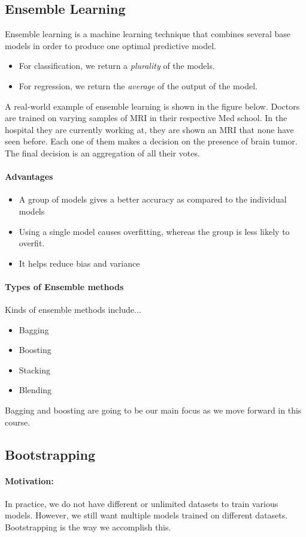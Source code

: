 \documentclass[10pt,a4paper]{report}
\begin{document}
\subsection{Ensemble Learning}
Ensemble learning is a machine learning technique that combines several base models in order to produce one optimal predictive model.
\begin{itemize}
\item For classification, we return a \textit{plurality} of the models.
\item For regression, we return the \textit{average} of the output of the model.
\end{itemize}
A real-world example of ensemble learning is shown in the figure below. Doctors are trained on varying samples of MRI in their respective Med school. In the hospital they are currently working at, they are shown an MRI that none have seen before. Each one of them makes a decision on the presence of brain tumor. The final decision is an aggregation of all their votes.\\
\paragraph{Advantages}
\begin{itemize}
\item A group of models gives a better accuracy as compared to the individual models
\item Using a single model causes overfitting, whereas the group is less likely to overfit.
\item It helps reduce bias and variance
\end{itemize}
\paragraph{Types of Ensemble methods}Kinds of ensemble methods include...
\begin{itemize}
\item Bagging \item Boosting \item Stacking \item Blending
\end{itemize}
Bagging and boosting are going to be our main focus as we move forward in this course.
\subsection{Bootstrapping}
\paragraph{Motivation:}In practice, we do not have different or unlimited datasets to train various models. However, we still want multiple models trained on different datasets. Bootstrapping is the way we accomplish this.
\end{document}
